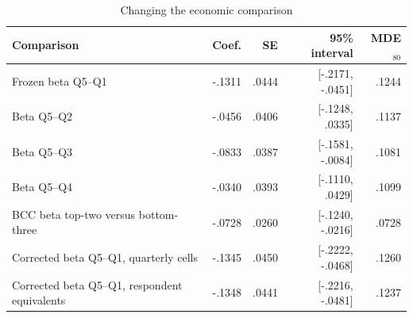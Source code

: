 \begin{table}[!htbp]
\centering
\caption{Changing the economic comparison}\label{tab:reallocation}
\begin{threeparttable}
\small
\setlength{\tabcolsep}{3.5pt}
\begin{tabularx}{\textwidth}{@{}Yrrrr@{}}
\toprule
Comparison & Coef. & SE & 95\% interval & MDE$_{80}$ \\
\midrule
Frozen beta Q5--Q1 & -.1311 & .0444 & [-.2171, -.0451] & .1244 \\
Beta Q5--Q2 & -.0456 & .0406 & [-.1248, .0335] & .1137 \\
Beta Q5--Q3 & -.0833 & .0387 & [-.1581, -.0084] & .1081 \\
Beta Q5--Q4 & -.0340 & .0393 & [-.1110, .0429] & .1099 \\
\midrule
BCC beta top-two versus bottom-three & -.0728 & .0260 & [-.1240, -.0216] & .0728 \\
Corrected beta Q5--Q1, quarterly cells & -.1345 & .0450 & [-.2222, -.0468] & .1260 \\
Corrected beta Q5--Q1, respondent equivalents & -.1348 & .0441 & [-.2216, -.0481] & .1237 \\
\bottomrule
\end{tabularx}
\end{threeparttable}
\end{table}

